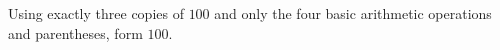 Using exactly three copies of $100$ and only the four basic arithmetic operations and parentheses, form $100$.
